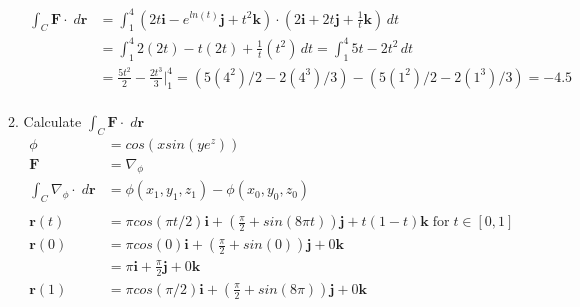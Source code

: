 \documentclass[11pt]{article}
\begin{document}
\begin{preview}
\begin{enumerate}
\begin{enumerate}
\begin{align*}
                    \int_C \textbf{F} \cdot \; d \textbf{r} & = \int_{1}^{4} \left(2t \textbf{i} - e^{ln(t)} \textbf{j} + t^2 \textbf{k}\right) \cdot \left(2 \textbf{i} + 2t \textbf{j} + \frac{1}{t} \textbf{k}\right)\,dt \\
                                                            & = \int_{1}^{4} 2(2t) - t(2t) + \frac{1}{t}(t^2) \,dt  = \int_{1}^{4} 5t - 2t^2 \,dt                                                                            \\
                                                            & = \frac{5t^2}{2} - \frac{2t^3}{3} \Big|_{1}^{4} = (5(4^2)/2 - 2(4^3)/3) - (5(1^2)/2 - 2(1^3)/3)=-4.5                                                           \\
                  \end{align*}
            \item Calculate $\int_C \textbf{F} \cdot \; d \textbf{r}$
                  \begin{align*}
                    \phi                                       & = cos(xsin(ye^{z}))                                                                                                                  \\
                    \textbf{F}                                 & = \nabla_{\phi}                                                                                                                      \\
                    \int_C \nabla_{\phi} \cdot \; d \textbf{r} & =\phi(x_1,y_1,z_1) - \phi(x_0,y_0,z_0)                                                                                               \\\\
                    \textbf{r}(t)                              & = \pi cos(\pi t/2)\textbf{i} + \left( \frac{\pi}{2} + sin(8\pi t)\right)\textbf{j} + t(1-t)\textbf{k} \; \mathrm{for} \; t \in [0,1] \\
                    \textbf{r}(0)                              & = \pi cos(0)\textbf{i} + \left( \frac{\pi}{2} + sin(0)\right)\textbf{j} + 0\textbf{k}                                                \\
                                                               & =                                          \pi\textbf{i} + \frac{\pi}{2} \textbf{j} + 0 \textbf{k}                                   \\
                    \textbf{r}(1)                              & = \pi cos(\pi/2)\textbf{i} + \left( \frac{\pi}{2} + sin(8\pi)\right)\textbf{j} + 0\textbf{k}                                         \\

\end{align*}
\end{enumerate}
\end{enumerate}
\end{preview}
\end{document}
